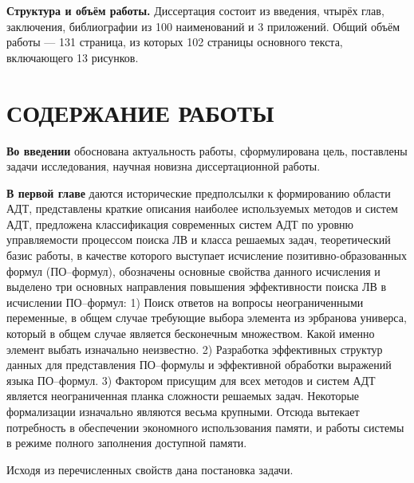 \documentclass[a4paper]{report}
\begin{document}
\textbf{Структура и объём работы.} Диссертация состоит из введения, чтырёх глав, заключения, библиографии из 100 наименований и 3 приложений. Общий объём работы --- 131 страница, из которых 102 страницы основного текста, включающего 13 рисунков.





\section*{СОДЕРЖАНИЕ РАБОТЫ}


\textbf{Во введении} обоснована актуальность работы, сформулирована цель, поставлены задачи исследования, научная новизна диссертационной работы.


\textbf{В первой главе} даются исторические предполсылки к формированию области АДТ, представлены краткие описания наиболее используемых методов и систем АДТ,  предложена классификация современных систем АДТ по уровню управляемости процессом поиска ЛВ и класса решаемых задач, теоретический базис работы, в качестве которого выступает исчисление позитивно-образованных формул (ПО--формул), обозначены основные свойства данного исчисления и выделено три основных направления повышения эффективности поиска ЛВ в исчислении ПО--формул: 1) Поиск ответов на вопросы неограниченными переменные, в общем случае требующие выбора элемента из эрбранова универса, который в общем случае является бесконечным множеством. Какой именно элемент выбать изначально неизвестно. 2) Разработка эффективных структур данных для представления ПО--формулы и эффективной обработки выражений языка ПО--формул. 3) Фактором присущим для всех методов и систем АДТ является неограниченная планка сложности решаемых задач. Некоторые формализации изначально являются весьма крупными. Отсюда вытекает потребность в обеспечении экономного использования памяти, и работы системы в режиме полного заполнения доступной памяти. 

Исходя из перечисленных свойств дана постановка задачи.
\end{document}
